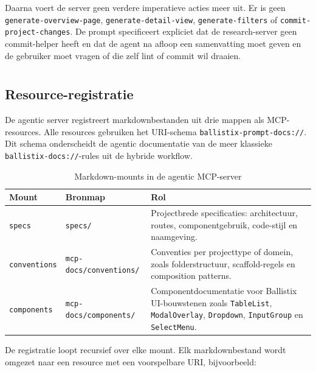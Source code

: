Daarna voert de server geen verdere imperatieve acties meer uit. Er is geen \texttt{generate-overview-page}, \texttt{generate-detail-view}, \texttt{generate-filters} of \texttt{commit-project-changes}. De prompt specificeert expliciet dat de research-server geen commit-helper heeft en dat de agent na afloop een samenvatting moet geven en de gebruiker moet vragen of die zelf lint of commit wil draaien.

\section{}
\label{sec:poc-agentic-resources}

\subsection{Resource-registratie}

De agentic server registreert markdownbestanden uit drie mappen als MCP-resources. Alle resources gebruiken het URI-schema \texttt{ballistix-prompt-docs://}. Dit schema onderscheidt de agentic documentatie van de meer klassieke \texttt{ballistix-docs://}-rules uit de hybride workflow.

\begin{table}[htbp]
  \centering
  \caption{Markdown-mounts in de agentic MCP-server}
  \label{tab:poc-agentic-resource-mounts}
  \small
  \begin{tabularx}{\textwidth}{|l|l|X|}
    \hline
    \textbf{Mount} & \textbf{Bronmap} & \textbf{Rol} \\
    \hline
    \texttt{specs} &
    \texttt{specs/} &
    Projectbrede specificaties: architectuur, routes, componentgebruik, code-stijl en naamgeving. \\
    \hline
    \texttt{conventions} &
    \texttt{mcp-docs/conventions/} &
    Conventies per projecttype of domein, zoals folderstructuur, scaffold-regels en composition patterns. \\
    \hline
    \texttt{components} &
    \texttt{mcp-docs/components/} &
    Componentdocumentatie voor Ballistix UI-bouwstenen zoals \texttt{TableList}, \texttt{ModalOverlay}, \texttt{Dropdown}, \texttt{InputGroup} en \texttt{SelectMenu}. \\
    \hline
  \end{tabularx}
\end{table}

De registratie loopt recursief over elke mount. Elk markdownbestand wordt omgezet naar een resource met een voorspelbare URI, bijvoorbeeld:

